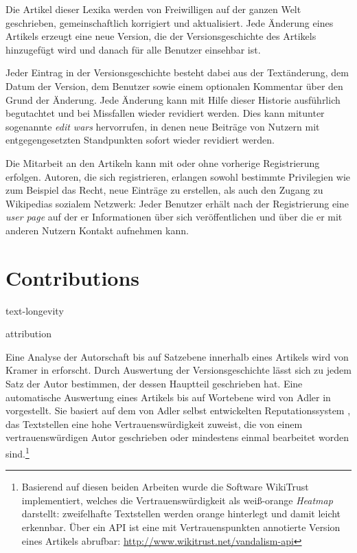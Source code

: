 
Die Artikel dieser Lexika werden von Freiwilligen auf der ganzen Welt geschrieben, gemeinschaftlich korrigiert und aktualisiert.
Jede Änderung eines Artikels erzeugt eine neue Version, die der Versionsgeschichte des Artikels hinzugefügt wird und danach für alle Benutzer einsehbar ist.


Jeder Eintrag in der Versionsgeschichte besteht dabei aus der Textänderung, dem Datum der Version, dem Benutzer sowie einem optionalen Kommentar über den Grund der Änderung.
Jede Änderung kann mit Hilfe dieser Historie ausführlich begutachtet und bei Missfallen wieder revidiert werden. 
Dies kann mitunter sogenannte \emph{edit wars} hervorrufen, in denen neue Beiträge von Nutzern mit entgegengesetzten Standpunkten sofort wieder revidiert werden.\cite{suh2007us} 


Die Mitarbeit an den Artikeln kann mit oder ohne vorherige Registrierung erfolgen.
Autoren, die sich registrieren, erlangen sowohl bestimmte Privilegien wie zum Beispiel das Recht, neue Einträge zu erstellen, als auch den Zugang zu Wikipedias sozialem Netzwerk:
Jeder Benutzer erhält nach der Registrierung eine \emph{user page} auf der er Informationen über sich veröffentlichen und über die er mit anderen Nutzern Kontakt aufnehmen kann.\cite{wikiwhyaccount}


\section{Contributions}\label{sec:contribution}


\begin{todos}
    \item text-longevity
    \item attribution
\end{todos}

Eine Analyse der Autorschaft bis auf Satzebene innerhalb eines Artikels wird von Kramer in \cite{kramer2008wiki} erforscht.
Durch Auswertung der Versionsgeschichte lässt sich zu jedem Satz der Autor bestimmen, der dessen Hauptteil geschrieben hat.
Eine automatische Auswertung eines Artikels bis auf Wortebene wird von Adler in \cite{adler2008assigning} vorgestellt.
Sie basiert auf dem von Adler selbst entwickelten Reputationssystem \cite{adler2007content}, das Textstellen eine hohe Vertrauenswürdigkeit zuweist, die von einem vertrauenswürdigen Autor geschrieben oder mindestens einmal bearbeitet worden sind.\footnote{Basierend auf diesen beiden Arbeiten wurde die Software WikiTrust implementiert, welches die Vertrauenswürdigkeit als weiß-orange \emph{Heatmap} darstellt: zweifelhafte Textstellen werden orange hinterlegt und damit leicht erkennbar. Über ein API ist eine mit Vertrauenspunkten annotierte Version eines Artikels abrufbar: \url{http://www.wikitrust.net/vandalism-api}\label{wikitrust}}

